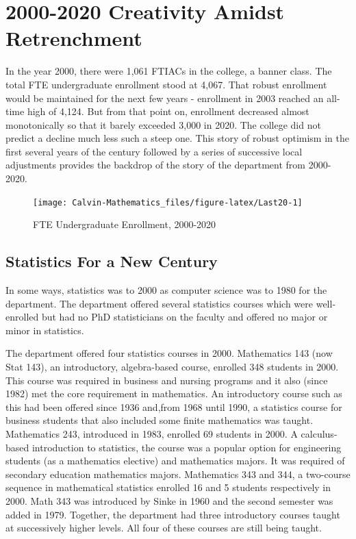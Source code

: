 \documentclass[
]{book}
\begin{document}
\hypertarget{creativity-amidst-retrenchment}{%
\chapter{2000-2020 Creativity Amidst Retrenchment}\label{creativity-amidst-retrenchment}}

In the year 2000, there were 1,061 FTIACs in the college, a banner class. The total FTE undergraduate enrollment stood at 4,067. That robust enrollment would be maintained for the next few years - enrollment in 2003 reached an all-time high of 4,124. But from that point on, enrollment decreased almost monotonically so that it barely exceeded 3,000 in 2020. The college did not predict a decline much less such a steep one. This story of robust optimism in the first several years of the century followed by a series of successive local adjustments provides the backdrop of the story of the department from 2000-2020.

\begin{figure}

{\centering \texttt{[image: Calvin-Mathematics\_files/figure-latex/Last20-1]} 

}

\caption{FTE Undergraduate Enrollment, 2000-2020}\label{fig:Last20}
\end{figure}

\hypertarget{statistics-for-a-new-century}{%
\section{Statistics For a New Century}\label{statistics-for-a-new-century}}

In some ways, statistics was to 2000 as computer science was to 1980 for the department. The department offered several statistics courses which were well-enrolled but had no PhD statisticians on the faculty and offered no major or minor in statistics.

The department offered four statistics courses in 2000. Mathematics 143 (now Stat 143), an introductory, algebra-based course, enrolled 348 students in 2000. This course was required in business and nursing programs and it also (since 1982) met the core requirement in mathematics. An introductory course such as this had been offered since 1936 and,from 1968 until 1990, a statistics course for business students that also included some finite mathematics was taught. Mathematics 243, introduced in 1983, enrolled 69 students in 2000. A calculus-based introduction to statistics, the course was a popular option for engineering students (as a mathematics elective) and mathematics majors. It was required of secondary education mathematics majors. Mathematics 343 and 344, a two-course sequence in mathematical statistics enrolled 16 and 5 students respectively in 2000. Math 343 was introduced by Sinke in 1960 and the second semester was added in 1979. Together, the department had three introductory courses taught at successively higher levels. All four of these courses are still being taught.
\end{document}
